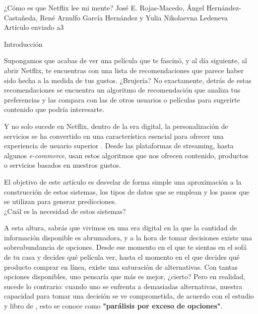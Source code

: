 \documentclass[letterpaper,10pt,final,hyphenatedtitles]{papertexKS}
\author{}
\title{}
\begin{document}
\newpage




\begin{news}{2}
	{¿Cómo es que Netflix lee mi mente?}
	{\textcolor{color}{José E. Rojas-Macedo}, \textcolor{color}{Ángel Hernández-Castañeda},  \textcolor{color}{René Arnulfo García Hernández} y \textcolor{color}{Yulia Nikolaevna Ledeneva}}
	{Artículo enviado}
	{a3}

	\noindent\textcolor{color}{\Large{Introducción}}

	Supongamos que acabas de ver una película que te fascinó, y al día siguiente, al abrir Netflix, te encuentras con una lista de recomendaciones que parece haber sido hecha a la medida de tus gustos. ¿Brujería? No exactamente, detrás de estas recomendaciones se encuentra un algoritmo de recomendación que analiza tus preferencias y las compara con las de otros usuarios o películas para sugerirte contenido que podría interesarte.
	
	Y no solo sucede en Netflix, dentro de la era digital, la personalización de servicios se ha convertido en una característica esencial para ofrecer una experiencia de usuario superior \cite{Deloitte2024}. Desde las plataformas de streaming, hasta algunos \textit{e-commerce}, usan estos algoritmos que nos ofrecen contenido, productos o servicios basados en nuestros gustos.

	El objetivo de este artículo es desvelar de forma simple una aproximación a la construcción de estos sistemas, los tipos de datos que se emplean y los pasos que se utilizan para generar predicciones.
	\\

	\noindent\textcolor{color}{\Large{¿Cuál es la necesidad de estos sistemas?}}

	A esta altura, sabrás que vivimos en una era digital en la que la cantidad de información disponible es abrumadora, y a la hora de tomar decisiones existe una sobreabundancia de opciones. Desde ese momento en el que te sientas en el sofá de tu casa y decides qué película ver, hasta el momento en el que decides qué producto comprar en línea, existe una saturación de alternativas. Con tantas opciones disponibles, uno pensaría que más es mejor, ¿cierto? Pero en realidad, sucede lo contrario: cuando uno se enfrenta a demasiadas alternativas, nuestra capacidad para tomar una decisión se ve comprometida, de acuerdo con el estudio y libro de \cite{schwartz2005qué}, esto se conoce como \textbf{"parálisis por exceso de opciones"}.


\end{news}
\end{document}
